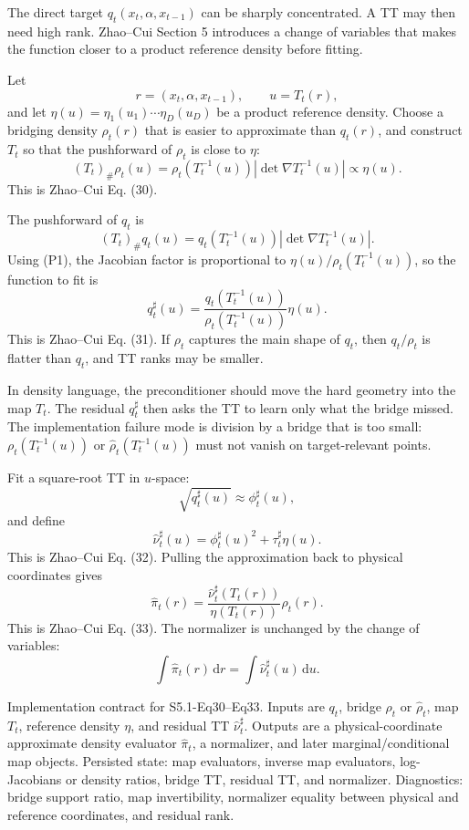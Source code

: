 \documentclass[11pt]{article}
\newcommand{\dd}{\,\mathrm d}
\begin{document}
The direct target \(q_t(x_t,\alpha,x_{t-1})\) can be sharply concentrated.  A TT
may then need high rank.  Zhao--Cui Section 5 introduces a change of variables
that makes the function closer to a product reference density before fitting.

Let
\[
    r=(x_t,\alpha,x_{t-1}),\qquad u=T_t(r),
\]
and let \(\eta(u)=\eta_1(u_1)\cdots\eta_D(u_D)\) be a product reference density.
Choose a bridging density \(\rho_t(r)\) that is easier to approximate than
\(q_t(r)\), and construct \(T_t\) so that the pushforward of \(\rho_t\) is close
to \(\eta\):
\[
    (T_t)_\#\rho_t(u)
    =
    \rho_t(T_t^{-1}(u))
    \left|\det\nabla T_t^{-1}(u)\right|
    \propto
    \eta(u).
    \tag{P1}
\]
This is Zhao--Cui Eq. (30).

The pushforward of \(q_t\) is
\[
    (T_t)_\#q_t(u)
    =
    q_t(T_t^{-1}(u))
    \left|\det\nabla T_t^{-1}(u)\right|.
\]
Using (P1), the Jacobian factor is proportional to
\(\eta(u)/\rho_t(T_t^{-1}(u))\), so the function to fit is
\[
    q^\sharp_t(u)
    =
    \frac{q_t(T_t^{-1}(u))}
    {\rho_t(T_t^{-1}(u))}
    \eta(u).
    \tag{P2}
\]
This is Zhao--Cui Eq. (31).  If \(\rho_t\) captures the main shape of \(q_t\),
then \(q_t/\rho_t\) is flatter than \(q_t\), and TT ranks may be smaller.

In density language, the preconditioner should move the hard geometry into the
map \(T_t\).  The residual \(q_t^\sharp\) then asks the TT to learn only what
the bridge missed.  The implementation failure mode is division by a bridge
that is too small: \(\rho_t(T_t^{-1}(u))\) or \(\widehat\rho_t(T_t^{-1}(u))\)
must not vanish on target-relevant points.

Fit a square-root TT in \(u\)-space:
\[
    \sqrt{q^\sharp_t(u)}\approx \phi^\sharp_t(u),
\]
and define
\[
    \widehat\nu^\sharp_t(u)
    =
    \phi^\sharp_t(u)^2+\tau^\sharp_t\eta(u).
    \tag{P3}
\]
This is Zhao--Cui Eq. (32).  Pulling the approximation back to physical
coordinates gives
\[
    \widehat\pi_t(r)
    =
    \frac{\widehat\nu^\sharp_t(T_t(r))}
    {\eta(T_t(r))}
    \rho_t(r).
    \tag{P4}
\]
This is Zhao--Cui Eq. (33).  The normalizer is unchanged by the change of
variables:
\[
    \int \widehat\pi_t(r)\dd r
    =
    \int \widehat\nu^\sharp_t(u)\dd u.
    \tag{P5}
\]

Implementation contract for S5.1-Eq30--Eq33.  Inputs are \(q_t\), bridge
\(\rho_t\) or \(\widehat\rho_t\), map \(T_t\), reference density \(\eta\), and
residual TT \(\widehat\nu_t^\sharp\).  Outputs are a physical-coordinate
approximate density evaluator \(\widehat\pi_t\), a normalizer, and later
marginal/conditional map objects.  Persisted state: map evaluators, inverse map
evaluators, log-Jacobians or density ratios, bridge TT, residual TT, and
normalizer.  Diagnostics: bridge support ratio, map invertibility,
normalizer equality between physical and reference coordinates, and residual
rank.
\end{document}
